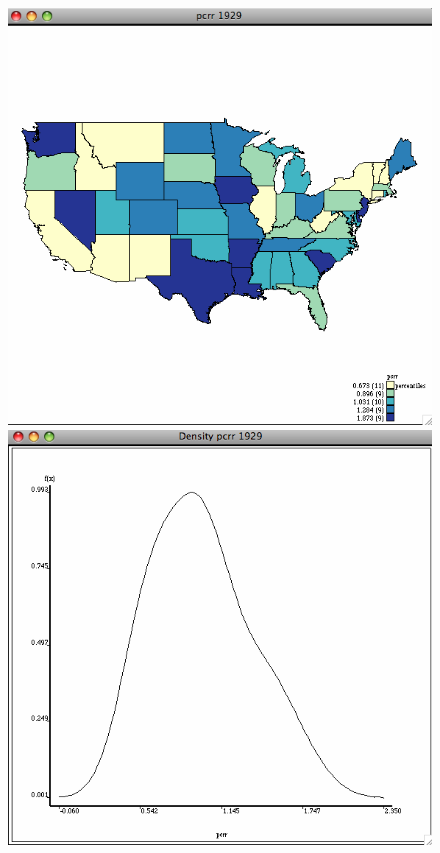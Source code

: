 \documentclass[nototal]{beamer}
\begin{document}
\begin{frame}
\begin{figure}[ht]
\begin{minipage}[b]{0.4\linewidth}
  \end{minipage}
 \begin{minipage}[b]{0.4\linewidth}
  \centering
  \includegraphics[scale=0.20]{income29random.png}
  \end{minipage}
 \begin{minipage}[b]{0.4\linewidth}
  \centering
  \includegraphics[scale=0.20]{density29random.png}
  \end{minipage}
  \end{figure}
 \end{frame} 
\end{document}
